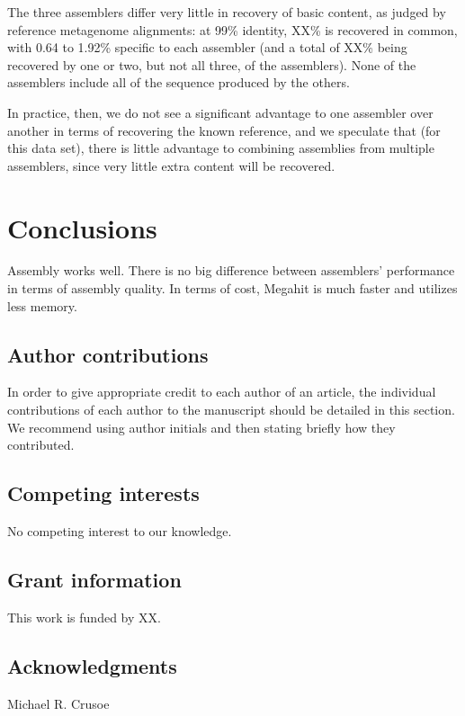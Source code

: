\documentclass[10pt,a4paper,twocolumn]{article}
\begin{document}
The three assemblers differ very little in recovery of basic content, as judged by reference metagenome alignments: at 99\% identity, XX\% is recovered in common, with 0.64 to 1.92\% specific to each assembler (and a total of XX\% being recovered by one or two, but not all three, of the assemblers). None of the assemblers include all of the sequence produced by the others. %

In practice, then, we do not see a significant advantage to one assembler over another in terms of recovering the known reference, and we speculate that (for this data set), there is little advantage to combining assemblies from multiple assemblers, since very little extra content will be recovered.


\section*{Conclusions}

Assembly works well. There is no big difference between assemblers' performance in terms of assembly quality. In terms of cost, Megahit is much faster and utilizes less memory. 



\subsection*{Author contributions}
In order to give appropriate credit to each author of an article, the individual
contributions of each author to the manuscript should be detailed in this section. We
recommend using author initials and then stating briefly how they contributed.

\subsection*{Competing interests}
No competing interest to our knowledge. 

\subsection*{Grant information}
This work is funded by XX. 

\subsection*{Acknowledgments}
Michael R. Crusoe
\end{document}
